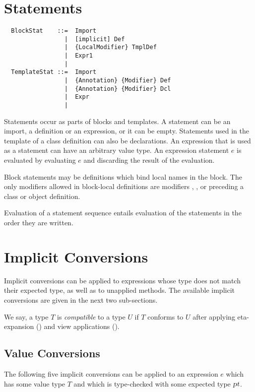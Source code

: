 \section{Statements}
\label{sec:statements}

\syntax\begin{lstlisting}
  BlockStat    ::=  Import
                 |  [implicit] Def
                 |  {LocalModifier} TmplDef
                 |  Expr1
                 | 
  TemplateStat ::=  Import
                 |  {Annotation} {Modifier} Def
                 |  {Annotation} {Modifier} Dcl
                 |  Expr
                 | 
\end{lstlisting}

Statements occur as parts of blocks and templates.  A statement can be
an import, a definition or an expression, or it can be empty.
Statements used in the template of a class definition can also be
declarations.  An expression that is used as a statement can have an
arbitrary value type. An expression statement $e$ is evaluated by
evaluating $e$ and discarding the result of the evaluation. 

Block statements may be definitions which bind local names in the
block. The only modifiers allowed in block-local definitions are modifiers
, , or  preceding a class or
object definition.

Evaluation of a statement sequence entails evaluation of the
statements in the order they are written.

\section{Implicit Conversions}
\label{sec:impl-conv}

Implicit conversions can be applied to expressions whose type does not
match their expected type, as well as to unapplied methods. The
available implicit conversions are given in the next two sub-sections.

We say, a type $T$ is {\em compatible} to a type $U$ if $T$ conforms
to $U$ after applying eta-expansion () and view applications
().

\subsection{Value Conversions}

The following five implicit conversions can be applied to an
expression $e$ which has some value type $T$ and which is type-checked with
some expected type $\mbox{\sl pt}$.

